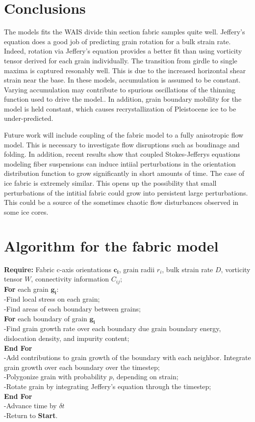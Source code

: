 \documentclass{article}
\begin{document}
\section{Conclusions}

The models fits the WAIS divide thin section fabric samples quite well. Jeffery's equation does a good job of predicting grain rotation for a bulk strain rate. Indeed, rotation via Jeffery's equation provides a better fit than using vorticity tensor derived for each grain individually. The transition from girdle to single maxima is captured resonably well. This is due to the increased horizontal shear strain near the base. In these models, accumulation is assumed to be constant. Varying accumulation may contribute to spurious oscillations of the thinning function used to drive the model.. In addition, grain boundary mobility for the model is held constant, which causes recrystallization of Pleistocene ice to be under-predicted.  

Future work will include coupling of the fabric model to a fully anisotropic flow model. This is necessary to investigate flow disruptions such as boudinage and folding. In addition, recent results \citep{montgomery-smith2011} show that coupled Stokes-Jefferys equations modeling fiber suspensions can induce intiial perturbations in the orientation distribution function to grow significantly in short amounts of time. The case of ice fabric is extremely similar. This opens up the possibility that small perturbations of the intitial fabric could grow into persistent large perturbations. This could be a source of the sometimes chaotic flow disturbances observed in some ice cores.




\appendix
\section{Algorithm for the fabric model}

\textbf{Require:} Fabric c-axis orientations $\mathbf{c_i}$, grain radii $r_i$, bulk strain rate $D$, vorticity tensor  $W$, connectivity information $C_{ij}$;
\\
\textbf{For} each grain $\mathbf{g_i}$:
\\
\intent -Find local stress on each grain;
\\
\indent -Find areas of each boundary between grains;
\\
\textbf{For} each boundary of grain $\mathbf{g_i}$
\\
\indent -Find grain growth rate over each boundary due grain boundary energy, dislocation density, and impurity content;
\\
\textbf{End For}
\\
\indent -Add contributions to grain growth of the boundary with each neighbor. Integrate grain growth over each boundary over the timestep;
\\
\indent -Polygonize grain with probability $p$, depending on strain;
\\
\indent -Rotate grain by integrating Jeffery's equation through the timestep;
\\
\textbf{End For}
\\
-Advance time by $\delta t$
\\
-Return to \textbf{Start}.
\end{document}
